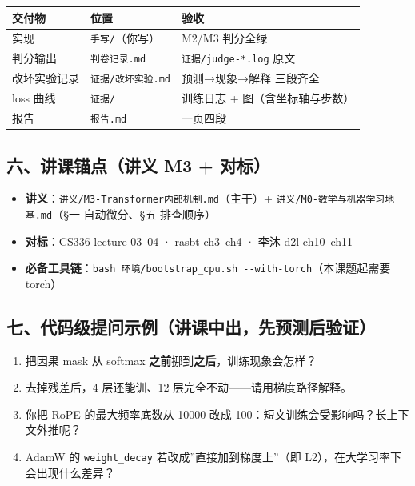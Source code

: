 \documentclass[
  chinese,
  11pt,
]{ctexart}
\newcounter{none} %
\providecommand{\tightlist}{%
  \setlength{\itemsep}{0pt}\setlength{\parskip}{0pt}}
\begin{document}
{\def\LTcaptype{none} %
\begin{longtable}[]{@{}lll@{}}
\toprule\noalign{}
交付物 & 位置 & 验收 \\
\midrule\noalign{}
\endhead
\bottomrule\noalign{}
\endlastfoot
实现 & \texttt{手写/}（你写） & M2/M3 判分全绿 \\
判分输出 & \texttt{判卷记录.md} & \texttt{证据/judge-*.log} 原文 \\
改坏实验记录 & \texttt{证据/改坏实验.md} & 预测→现象→解释 三段齐全 \\
loss 曲线 & \texttt{证据/} & 训练日志 + 图（含坐标轴与步数） \\
报告 & \texttt{报告.md} & 一页四段 \\
\end{longtable}
}

\subsection{六、讲课锚点（讲义 M3 + 对标）}\label{ux516dux8bb2ux8bfeux951aux70b9ux8bb2ux4e49-m3-ux5bf9ux6807}

\begin{itemize}
\tightlist
\item
  \textbf{讲义}：\texttt{讲义/M3-Transformer内部机制.md}（主干）+ \texttt{讲义/M0-数学与机器学习地基.md}（§一 自动微分、§五 排查顺序）
\item
  \textbf{对标}：CS336 lecture 03--04 · rasbt ch3--ch4 · 李沐 d2l ch10--ch11
\item
  \textbf{必备工具链}：\texttt{bash\ 环境/bootstrap\_cpu.sh\ -\/-with-torch}（本课题起需要 torch）
\end{itemize}

\subsection{七、代码级提问示例（讲课中出，先预测后验证）}\label{ux4e03ux4ee3ux7801ux7ea7ux63d0ux95eeux793aux4f8bux8bb2ux8bfeux4e2dux51faux5148ux9884ux6d4bux540eux9a8cux8bc1}

\begin{enumerate}
\def\labelenumi{\arabic{enumi}.}
\tightlist
\item
  把因果 mask 从 softmax \textbf{之前}挪到\textbf{之后}，训练现象会怎样？
\item
  去掉残差后，4 层还能训、12 层完全不动------请用梯度路径解释。
\item
  你把 RoPE 的最大频率底数从 10000 改成 100：短文训练会受影响吗？长上下文外推呢？
\item
  AdamW 的 \texttt{weight\_decay} 若改成''直接加到梯度上''（即 L2），在大学习率下会出现什么差异？
\end{enumerate}
\end{document}

